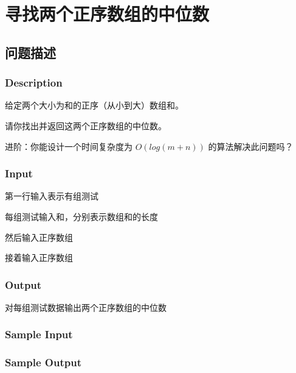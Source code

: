 \section{寻找两个正序数组的中位数}
\subsection{问题描述}
\subsubsection*{Description}
给定两个大小为和的正序（从小到大）数组和。

请你找出并返回这两个正序数组的中位数。

进阶：你能设计一个时间复杂度为 $O(log (m+n))$ 的算法解决此问题吗？

\subsubsection*{Input}

第一行输入表示有组测试

每组测试输入和，分别表示数组和的长度

然后输入正序数组

接着输入正序数组

\subsubsection*{Output}

对每组测试数据输出两个正序数组的中位数

\subsubsection*{Sample Input}








\subsubsection*{Sample Output}

